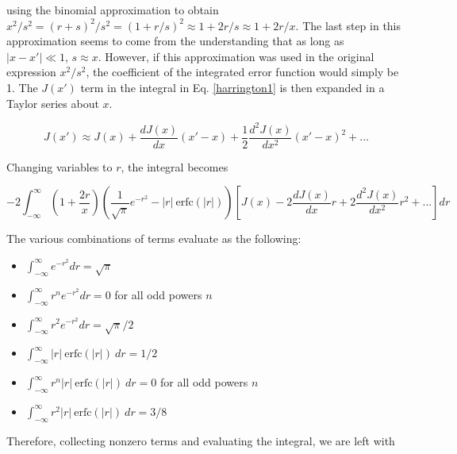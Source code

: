 \documentclass[onecolumn]{aastex63}
\begin{document}
using the binomial approximation to obtain $x^2/s^2 = (r+s)^2/s^2 = (1+r/s)^2 \approx 1 + 2r/s \approx 1 + 2r/x$. The last step in this approximation seems to come from the understanding that as long as $|x-x'|\ll 1$, $s \approx x$. However, if this approximation was used in the original expression $x^2/s^2$, the coefficient of the integrated error function would simply be 1. The $J(x')$ term in the integral in Eq. \ref{harrington1} is then expanded in a Taylor series about $x$.

\begin{equation}
    J(x') \approx J(x) + \frac{dJ(x)}{dx}(x' - x) + \frac{1}{2}\frac{d^2J(x)}{dx^2}(x'-x)^2 + ...
\end{equation}

Changing variables to $r$, the integral becomes

\begin{equation}
    -2 \int_{-\infty}^{\infty} \left(1+\frac{2r}{x}\right)\left(\frac{1}{\sqrt{\pi}}e^{-r^2} - |r|\ \mathrm{erfc}(|r|)\right)\left[J(x) - 2\frac{dJ(x)}{dx}r + 2\frac{d^2J(x)}{dx^2}r^2 + ...\right] dr
\end{equation}

The various combinations of terms evaluate as the following:

\begin{itemize}
    \item $\int_{-\infty}^{\infty} e^{-r^2} dr = \sqrt{\pi}$
    \item $\int_{-\infty}^{\infty} r^{n} e^{-r^2} dr = 0$ for all odd powers $n$
    \item $\int_{-\infty}^{\infty} r^2 e^{-r^2} dr = \sqrt{\pi}/2$
    \item $\int_{-\infty}^{\infty} |r|\ \mathrm{erfc}(|r|)\ dr = 1/2$
    \item $\int_{-\infty}^{\infty} r^n |r|\ \mathrm{erfc}(|r|)\ dr = 0$ for all odd powers $n$
    \item $\int_{-\infty}^{\infty} r^2 |r|\ \mathrm{erfc}(|r|)\ dr = 3/8$
\end{itemize}

Therefore, collecting nonzero terms and evaluating the integral, we are left with
\end{document}
